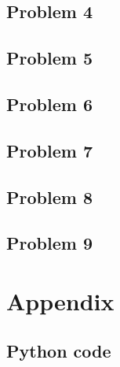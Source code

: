 \documentclass{article}
\begin{document}
\subsection*{Problem 4}

\subsection*{Problem 5}

\subsection*{Problem 6}

\subsection*{Problem 7}

\subsection*{Problem 8}

\subsection*{Problem 9}

\section*{Appendix}

\subsection*{Python code}
\hypertarget{pythonsourcecode}{}

\end{document}
